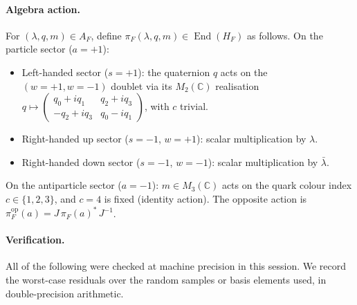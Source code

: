 \documentclass[11pt,a4paper]{article}
\begin{document}
\paragraph{Algebra action.}
For $(\lambda, q, m) \in A_F$, define $\pi_F(\lambda, q, m) \in \operatorname{End}(H_F)$
as follows. On the particle sector ($a = +1$):
\begin{itemize}[leftmargin=2em]
  \item Left-handed sector ($s = +1$): the quaternion $q$ acts on the
        $(w = +1, w = -1)$ doublet via its $M_2(\mathbb{C})$ realisation
        $q \mapsto \begin{pmatrix} q_0 + i q_1 & q_2 + i q_3 \\
        -q_2 + i q_3 & q_0 - i q_1 \end{pmatrix}$, with $c$ trivial.
  \item Right-handed up sector ($s = -1$, $w = +1$): scalar multiplication
        by $\lambda$.
  \item Right-handed down sector ($s = -1$, $w = -1$): scalar multiplication
        by $\bar\lambda$.
\end{itemize}
On the antiparticle sector ($a = -1$): $m \in M_3(\mathbb{C})$ acts on the
quark colour index $c \in \{1,2,3\}$, and $c = 4$ is fixed (identity action).
The opposite action is $\pi_F^{\mathrm{op}}(a) = J\, \pi_F(a)^*\, J^{-1}$.

\paragraph{Verification.}
All of the following were checked at machine precision in this session. We
record the worst-case residuals over the random samples or basis elements used,
in double-precision arithmetic.
\end{document}
